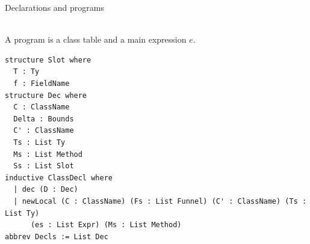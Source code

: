 \begin{cmp}{Declarations and programs}
\begin{paperside}
\\[1ex]
A program is a class table \decls and a main expression $e$.
\end{paperside}
\begin{leanside}
\begin{lstlisting}[style=leanside]
structure Slot where
  T : Ty
  f : FieldName
structure Dec where
  C : ClassName
  Delta : Bounds
  C' : ClassName
  Ts : List Ty
  Ms : List Method
  Ss : List Slot
inductive ClassDecl where
  | dec (D : Dec)
  | newLocal (C : ClassName) (Fs : List Funnel) (C' : ClassName) (Ts : List Ty)
      (es : List Expr) (Ms : List Method)
abbrev Decls := List Dec
\end{lstlisting}
\end{leanside}
\end{cmp}

